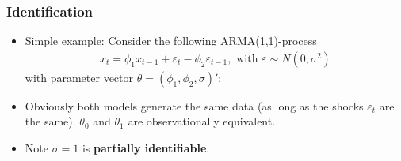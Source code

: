 \documentclass[handout]{beamer}  %
\begin{document}
\begin{frame}\frametitle{Identification}
\begin{itemize}[<+->]
  \item Simple example: Consider the following ARMA(1,1)-process
  \begin{align*}
  x_t = \phi_1 x_{t-1} + \varepsilon_t -\phi_2 \varepsilon_{t-1}, \text{ with } \varepsilon \sim N(0,\sigma^2)
\end{align*}
with parameter vector $\theta=(\phi_1,\phi_2,\sigma)'$:\pause
\begin{figure}[htbp]
\end{figure}
\item Obviously both models generate the same data (as long as the shocks $\varepsilon_t$ are the same). $\theta_0$ and $\theta_1$ are observationally equivalent.
\item Note $\sigma=1$ is \textbf{partially identifiable}.
\end{itemize}
\end{frame}
\end{document}

